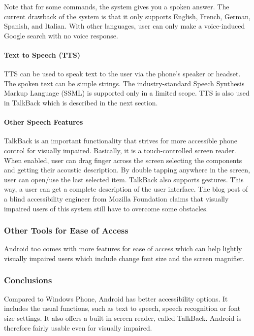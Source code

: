 Note that for some commands, the system gives you a spoken answer. The current drawback of the system is that it only supports English, French, German, Spanish, and Italian. With other languages, user can only make a voice-induced Google search with no voice response.
\paragraph{Text to Speech (TTS)}
TTS can be used to speak text to the user via the phone's speaker or headset. The spoken text can be simple strings. The industry-standard Speech Synthesis Markup Language (SSML) is supported only in a limited scope. TTS is also used in TalkBack which is described in the next section.
\paragraph{Other Speech Features}
TalkBack is an important functionality that strives for more accessible phone control for visually impaired. Basically, it is a touch-controlled screen reader. When enabled, user can drag finger across the screen selecting the components and getting their acoustic description. By double tapping anywhere in the screen, user can open/use the last selected item. TalkBack also supports gestures. This way, a user can get a complete description of the user interface. The blog post of a blind accessibility engineer from Mozilla Foundation \cite{mozillaguy} claims that visually impaired users of this system still have to overcome some obstacles.

\subsubsection{Other Tools for Ease of Access}
Android too comes with more features for ease of access which can help lightly visually impaired users which include change font size and the screen magnifier.

\subsubsection{Conclusions}
Compared to Windows Phone, Android has better accessibility options. It includes the usual functions, such as text to speech, speech recognition or font size settings. It also offers a built-in screen reader, called TalkBack. Android is therefore fairly usable even for visually impaired.

\endinput
